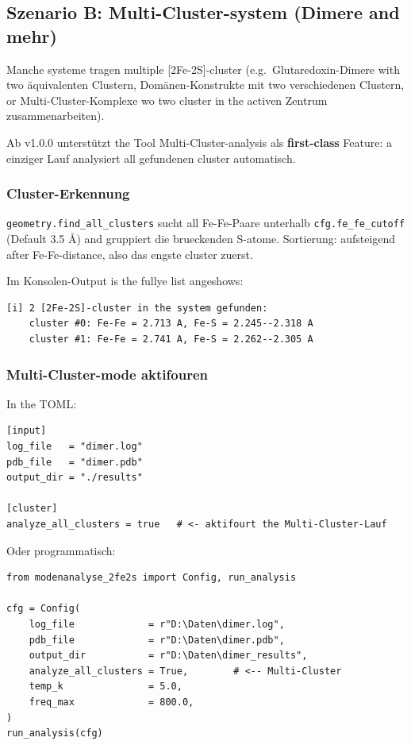 \documentclass[11pt,a4paper,twoside]{article}
\theoremstyle{remark}
\begin{document}
\subsection{Szenario B: Multi-Cluster-system (Dimere and mehr)}
\label{sec:workflow-multi}

Manche systeme tragen multiple {[}2Fe-2S{]}-cluster (e.g.\
Glutaredoxin-Dimere with two \"aquivalenten Clustern, Dom\"anen-Konstrukte
mit two verschiedenen Clustern, or Multi-Cluster-Komplexe wo two
cluster in the activen Zentrum zusammenarbeiten).

Ab v1.0.0 unterst\"utzt the Tool Multi-Cluster-analysis als
\textbf{first-class} Feature: a einziger Lauf analysiert all gefundenen
cluster automatisch.

\subsubsection*{Cluster-Erkennung}

\texttt{geometry.find\_all\_clusters} sucht all Fe-Fe-Paare unterhalb
\texttt{cfg.fe\_fe\_cutoff} (Default 3.5 \AA{}) and gruppiert die
brueckenden S-atome. Sortierung: aufsteigend after Fe-Fe-distance, also
das engste cluster zuerst.

Im Konsolen-Output is the fullye list angeshows:

\begin{lstlisting}[style=bash]
[i] 2 [2Fe-2S]-cluster in the system gefunden:
    cluster #0: Fe-Fe = 2.713 A, Fe-S = 2.245--2.318 A
    cluster #1: Fe-Fe = 2.741 A, Fe-S = 2.262--2.305 A
\end{lstlisting}

\subsubsection*{Multi-Cluster-mode aktifouren}

In the TOML:

\begin{lstlisting}[style=python]
[input]
log_file   = "dimer.log"
pdb_file   = "dimer.pdb"
output_dir = "./results"

[cluster]
analyze_all_clusters = true   # <- aktifourt the Multi-Cluster-Lauf
\end{lstlisting}

Oder programmatisch:

\begin{lstlisting}[style=python]
from modenanalyse_2fe2s import Config, run_analysis

cfg = Config(
    log_file             = r"D:\Daten\dimer.log",
    pdb_file             = r"D:\Daten\dimer.pdb",
    output_dir           = r"D:\Daten\dimer_results",
    analyze_all_clusters = True,        # <-- Multi-Cluster
    temp_k               = 5.0,
    freq_max             = 800.0,
)
run_analysis(cfg)
\end{lstlisting}
\end{document}
